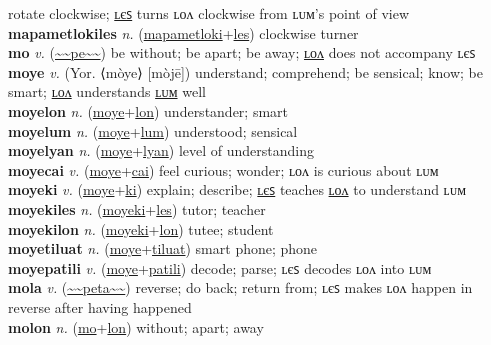 rotate clockwise; \hyperref[mapametlokiles]{ʟєꜱ} turns ʟᴏᴧ clockwise from ʟᴜᴍ's point of view \label{mapametloki} \\
\textbf{mapametlokiles} \textit{n.} (\hyperref[mapametloki]{mapametloki}+\hyperref[les]{les})
clockwise turner \label{mapametlokiles} \\
\textbf{mo} \textit{v.} (\hyperref[pe]{\~{}\~{}pe\~{}\~{}})
be without; be apart; be away; \hyperref[molon]{ʟᴏᴧ} does not accompany ʟєꜱ \label{mo} \\
\textbf{moye} \textit{v.} (Yor. ⟨mòye⟩ [mòjē])
understand; comprehend; be sensical; know; be smart; \hyperref[moyelon]{ʟᴏᴧ} understands \hyperref[moyelum]{ʟᴜᴍ} well \label{moye} \\
\textbf{moyelon} \textit{n.} (\hyperref[moye]{moye}+\hyperref[lon]{lon})
understander; smart \label{moyelon} \\
\textbf{moyelum} \textit{n.} (\hyperref[moye]{moye}+\hyperref[lum]{lum})
understood; sensical \label{moyelum} \\
\textbf{moyelyan} \textit{n.} (\hyperref[moye]{moye}+\hyperref[lyan]{lyan})
level of understanding \label{moyelyan} \\
\textbf{moyecai} \textit{v.} (\hyperref[moye]{moye}+\hyperref[cai]{cai})
feel curious; wonder; ʟᴏᴧ is curious about ʟᴜᴍ \label{moyecai} \\
\textbf{moyeki} \textit{v.} (\hyperref[moye]{moye}+\hyperref[ki]{ki})
explain; describe; \hyperref[moyekiles]{ʟєꜱ} teaches \hyperref[moyekilon]{ʟᴏᴧ} to understand ʟᴜᴍ \label{moyeki} \\
\textbf{moyekiles} \textit{n.} (\hyperref[moyeki]{moyeki}+\hyperref[les]{les})
tutor; teacher \label{moyekiles} \\
\textbf{moyekilon} \textit{n.} (\hyperref[moyeki]{moyeki}+\hyperref[lon]{lon})
tutee; student \label{moyekilon} \\
\textbf{moyetiluat} \textit{n.} (\hyperref[moye]{moye}+\hyperref[tiluat]{tiluat})
smart phone; phone \label{moyetiluat} \\
\textbf{moyepatili} \textit{v.} (\hyperref[moye]{moye}+\hyperref[patili]{patili})
decode; parse; ʟєꜱ decodes ʟᴏᴧ into ʟᴜᴍ \label{moyepatili} \\
\textbf{mola} \textit{v.} (\hyperref[peta]{\~{}\~{}peta\~{}\~{}})
reverse; do back; return from; ʟєꜱ makes ʟᴏᴧ happen in reverse after having happened \label{mola} \\
\textbf{molon} \textit{n.} (\hyperref[mo]{mo}+\hyperref[lon]{lon})
without; apart; away \label{molon} \\
